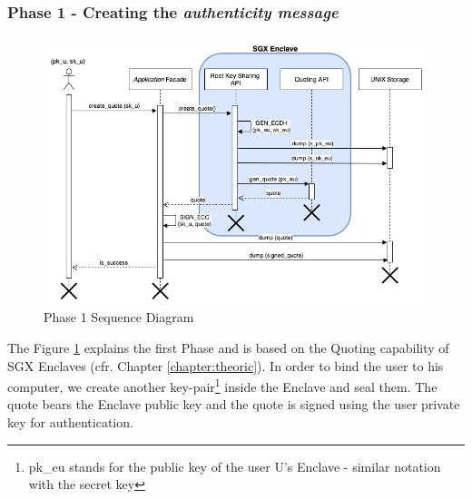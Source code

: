 \documentclass[../main.tex]{subfiles}
\begin{document}
\subsubsection{Phase 1 - Creating the \textit{authenticity message}}
\begin{figure}[h]
    \centering
    \includegraphics[width=\textwidth]{../../images/lauxus/create_quote}
    
    \caption{Phase 1 Sequence Diagram}
    \label{figure:lauxus:create_quote}
\end{figure}
\par The Figure \ref{figure:lauxus:create_quote} explains the first Phase and is based on the Quoting capability of SGX Enclaves (cfr. Chapter \ref{chapter:theoric}). In order to bind the user to his computer, we create another key-pair\footnote{pk\_eu stands for the public key of the user U's Enclave - similar notation with the secret key} inside the Enclave and seal them. The quote bears the Enclave public key and the quote is signed using the user private key for authentication.
\end{document}
